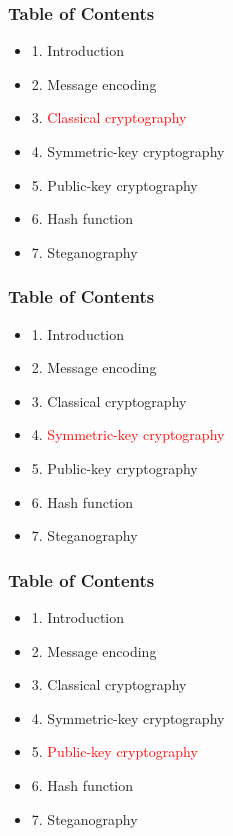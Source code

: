 \documentclass[handout, xcolor=dvipsnames,aspectratio=169]{beamer}
\begin{document}
\begin{frame}
  \centering
  \frametitle{Table of Contents}
  \begin{itemize}
    \item 1. Introduction
    \item 2. Message encoding
    \item 3. \textcolor{red}{Classical cryptography}
    \item 4. Symmetric-key cryptography
    \item 5. Public-key cryptography
    \item 6. Hash function
    \item 7. Steganography
  \end{itemize}  
\end{frame}

\begin{frame}
  \centering
  \frametitle{Table of Contents}
  \begin{itemize}
    \item 1. Introduction
    \item 2. Message encoding
    \item 3. Classical cryptography
    \item 4. \textcolor{red}{Symmetric-key cryptography}
    \item 5. Public-key cryptography
    \item 6. Hash function
    \item 7. Steganography
  \end{itemize}  
\end{frame}

\begin{frame}
  \centering
  \frametitle{Table of Contents}
  \begin{itemize}
    \item 1. Introduction
    \item 2. Message encoding
    \item 3. Classical cryptography
    \item 4. Symmetric-key cryptography
    \item 5. \textcolor{red}{Public-key cryptography}
    \item 6. Hash function
    \item 7. Steganography
  \end{itemize}  
\end{frame}

\end{document}
